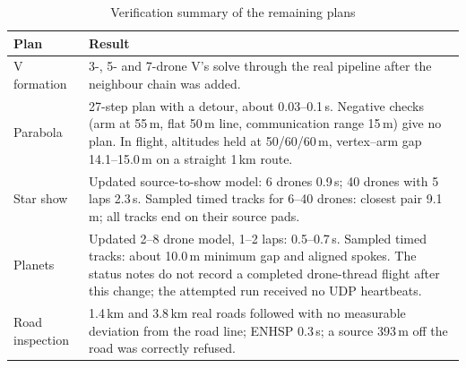 \documentclass[11pt,a4paper,oneside]{report}
\begin{document}
\begin{table}[H]
\caption{Verification summary of the remaining plans}\label{tab:other}
\small
\begin{tabularx}{\textwidth}{@{}lY@{}}
\toprule
\textbf{Plan} & \textbf{Result} \\
\midrule
V formation & 3-, 5- and 7-drone V's solve through the real pipeline after the neighbour chain was
added. \\
Parabola & 27-step plan with a detour, about 0.03--0.1\,s. Negative checks (arm at 55\,m, flat
50\,m line, communication range 15\,m) give no plan. In flight, altitudes held at 50/60/60\,m,
vertex--arm gap 14.1--15.0\,m on a straight 1\,km route. \\
Star show & Updated source-to-show model: 6 drones 0.9\,s; 40 drones with 5 laps 2.3\,s.
Sampled timed tracks for 6--40 drones: closest pair 9.1\,m; all tracks end on their source pads. \\
Planets & Updated 2--8 drone model, 1--2 laps: 0.5--0.7\,s. Sampled timed tracks: about
10.0\,m minimum gap and aligned spokes. The status notes do not record a completed drone-thread
flight after this change; the attempted run received no UDP heartbeats. \\
Road inspection & 1.4\,km and 3.8\,km real roads followed with no measurable deviation from the
road line; ENHSP 0.3\,s; a source 393\,m off the road was correctly refused. \\
\bottomrule
\end{tabularx}
\end{table}
\end{document}
